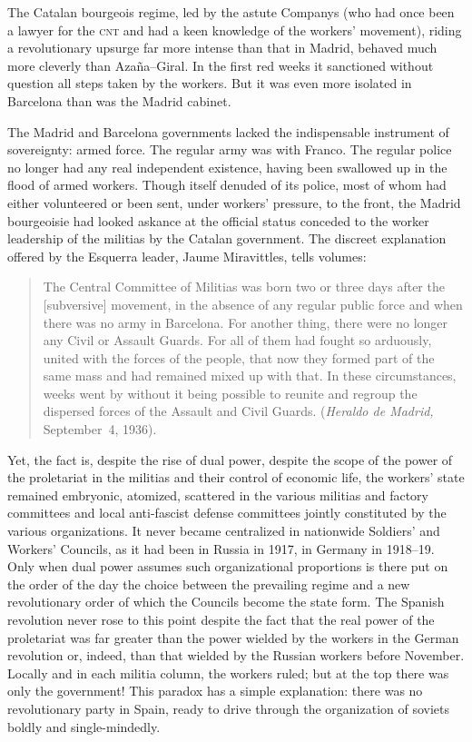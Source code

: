 The Catalan bourgeois regime, led by the astute Companys{\indexLCompanys} (who had once been a lawyer for the \textsc{cnt} and had a keen knowledge of the workers’ movement), riding a revolutionary upsurge far more intense than that in Madrid, behaved much more cleverly than Azaña--Giral. In the first red weeks it sanctioned without question all steps taken by the workers. But it was even more isolated in Barcelona than was the Madrid cabinet.

\indexEsquerra{}
The Madrid and Barcelona governments lacked the indispensable instrument of sovereignty: armed force. The regular army was with Franco. The regular police no longer had any real independent existence, having been swallowed up in the flood of armed workers. Though itself denuded of its police, most of whom had either volunteered or been sent, under workers’ pressure, to the front, the Madrid bourgeoisie had looked askance at the official status conceded to the worker leadership of the militias by the Catalan government. The discreet explanation offered by the Esquerra leader, Jaume Miravittles, tells volumes:

\begin{quotation}
  The Central Committee of Militias was born two or three days after the [subversive] movement, in the absence of any regular public force and when there was no army in Barcelona. For another thing, there were no longer any Civil or Assault Guards. For all of them had fought so arduously, united with the forces of the people, that now they formed part of the same mass and had remained mixed up with that. In these circumstances, weeks went by without it being possible to reunite and regroup the dispersed forces of the Assault and Civil Guards. (\emph{Heraldo de Madrid,} September~4, 1936).
\end{quotation}

Yet, the fact is, despite the rise of dual power, despite the scope of the power of the proletariat in the militias and their control of economic life, the workers’ state remained embryonic, atomized, scattered in the various militias and factory committees and local anti-fascist defense committees jointly constituted by the various organizations. It never became centralized in nationwide Soldiers’ and Workers’ Councils, as it had been in Russia in 1917, in Germany in 1918–19. Only when dual power assumes such organizational proportions is there put on the order of the day the choice between the prevailing regime and a new revolutionary order of which the Councils become the state form. The Spanish revolution never rose to this point despite the fact that the real power of the proletariat was far greater than the power wielded by the workers in the German revolution or, indeed, than that wielded by the Russian workers before November. Locally and in each militia column, the workers ruled; but at the top there was only the government! This paradox has a simple explanation: there was no revolutionary party in Spain, ready to drive through the organization of soviets boldly and single-mindedly.

